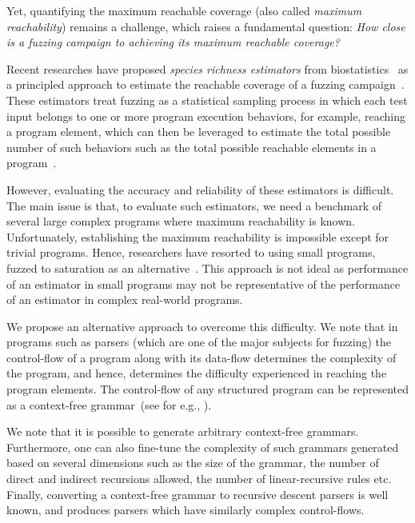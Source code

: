 \documentclass[conference]{IEEEtran}
\begin{document}
Yet, quantifying the maximum reachable coverage (also called \emph{maximum reachability})
remains a challenge, which raises a fundamental question:
\emph{How close is a fuzzing campaign to achieving its maximum reachable coverage?}

Recent researches have proposed \emph{species richness estimators} from
biostatistics~\cite{chao2016species} as a principled approach to estimate
the reachable coverage of a fuzzing campaign~\cite{boehme2018stads}.
These estimators treat fuzzing as a statistical sampling process in which
each test input belongs to one or more program execution behaviors,
for example, reaching a program element, which can then be leveraged to
estimate the total possible number of such behaviors such as the total
possible reachable elements in a program~\cite{boehme2018stads}.


However, evaluating the accuracy and reliability
of these estimators is difficult. The main issue is that, to evaluate such
estimators, we need a benchmark of several large complex programs where
maximum reachability is known. Unfortunately, establishing the maximum
reachability is impossible except for trivial programs. Hence, researchers have resorted to using small programs, fuzzed to saturation as an alternative~\cite{liyanage2023reachable}.
This approach is not ideal as performance of an estimator in small
programs may not be representative of the performance of an estimator in complex
real-world programs.

We propose an alternative approach to overcome this difficulty. We note that
in programs such as parsers (which are one of the major subjects for fuzzing)
the control-flow of a program along with its data-flow determines the
complexity of the program, and hence, determines the difficulty
experienced in reaching the program elements. The control-flow of any
structured program can be represented as a context-free
grammar~(see for e.g., ).

We note that it is possible to generate arbitrary
context-free grammars. Furthermore, one can also fine-tune the complexity
of such grammars generated based on several dimensions such as the size
of the grammar, the number of direct and indirect recursions allowed, the
number of linear-recursive rules etc.
Finally, converting a context-free grammar to recursive descent
parsers is well known, and produces parsers which have similarly complex
control-flows.
\end{document}
